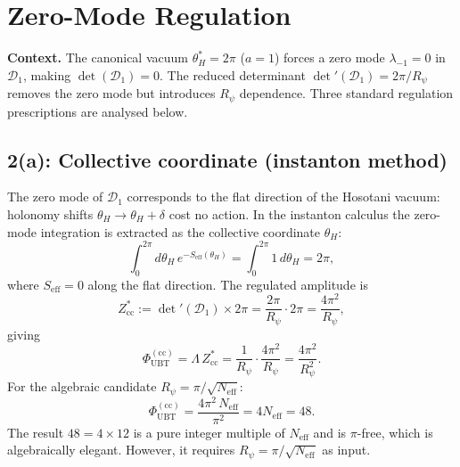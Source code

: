 \documentclass[11pt,a4paper]{article}
\theoremstyle{definition}
\theoremstyle{remark}
\begin{document}
\section{Zero-Mode Regulation}
\label{sec:zeromode_regulation}

\textbf{Context.}
The canonical vacuum $\theta_H^* = 2\pi$ ($a = 1$) forces a zero mode
$\lambda_{-1} = 0$ in $\mathcal{D}_1$, making $\det(\mathcal{D}_1) = 0$.
The reduced determinant $\det'(\mathcal{D}_1) = 2\pi/R_\psi$ removes the
zero mode but introduces $R_\psi$ dependence.
Three standard regulation prescriptions are analysed below.

\subsection{2(a): Collective coordinate (instanton method)}
\label{subsec:collective_coord}

The zero mode of $\mathcal{D}_1$ corresponds to the flat direction of
the Hosotani vacuum: holonomy shifts $\theta_H \to \theta_H + \delta$
cost no action.
In the instanton calculus the zero-mode integration is extracted as
the collective coordinate $\theta_H$:
\begin{equation}
  \int_0^{2\pi} d\theta_H\,e^{-S_{\mathrm{eff}}(\theta_H)}
  = \int_0^{2\pi} 1\,d\theta_H = 2\pi,
  \label{eq:cc_volume}
\end{equation}
where $S_{\mathrm{eff}} = 0$ along the flat direction.
The regulated amplitude is
\begin{equation}
  Z^*_{\mathrm{cc}}
  := \det'(\mathcal{D}_1)\times 2\pi
  = \frac{2\pi}{R_\psi}\cdot 2\pi
  = \frac{4\pi^2}{R_\psi},
  \label{eq:Zcc}
\end{equation}
giving
\begin{equation}
  \Phi_{\mathrm{UBT}}^{(\mathrm{cc})}
  = \Lambda\,Z^*_{\mathrm{cc}}
  = \frac{1}{R_\psi}\cdot\frac{4\pi^2}{R_\psi}
  = \frac{4\pi^2}{R_\psi^2}.
  \label{eq:phi_cc}
\end{equation}
For the algebraic candidate $R_\psi = \pi/\sqrt{N_{\mathrm{eff}}}$:
\begin{equation}
  \Phi_{\mathrm{UBT}}^{(\mathrm{cc})}
  = \frac{4\pi^2\,N_{\mathrm{eff}}}{\pi^2}
  = 4N_{\mathrm{eff}} = 48.
  \label{eq:phi_cc_value}
\end{equation}
The result $48 = 4 \times 12$ is a pure integer multiple of
$N_{\mathrm{eff}}$ and is $\pi$-free, which is algebraically elegant.
However, it requires $R_\psi = \pi/\sqrt{N_{\mathrm{eff}}}$ as input.
\end{document}
